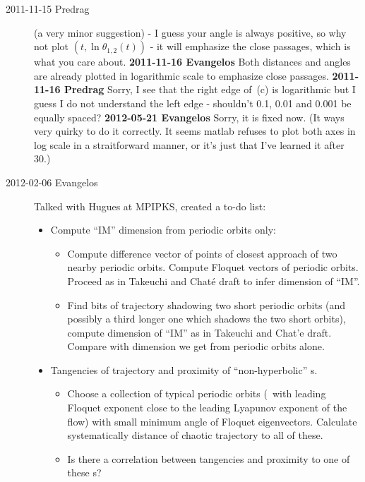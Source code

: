 \begin{description}
\item[2011-11-15 Predrag] (a very minor suggestion) - I guess your angle
is always positive, so why not plot $(t,\ln \theta_{1,2}(t))$ - it will
emphasize the close passages, which is what you care about.
{\bf 2011-11-16 Evangelos} Both distances and angles are already plotted
in logarithmic scale to emphasize close passages.
{\bf 2011-11-16 Predrag}
Sorry, I see that the right edge of \,(c) is logarithmic
but I guess I do not understand the left edge - shouldn't 0.1, 0.01 and 0.001
be equally spaced? {\bf 2012-05-21 Evangelos} Sorry, it is fixed now.
(It ways very quirky to do it correctly. It seems matlab refuses to
plot both axes in log scale in a straitforward manner,
or it's just that I've learned it after 30.)

\item[2012-02-06 Evangelos] Talked with Hugues at MPIPKS, created a to-do list:
\begin{itemize}
  \item Compute ``IM'' dimension from periodic orbits only:
	\begin{itemize}
        \item
        Compute difference vector of points of closest approach of two
        nearby periodic orbits. Compute Floquet vectors of periodic
        orbits. Proceed as in Takeuchi and Chat\'e draft to infer
        dimension of ``IM''.
        \item
        Find bits of trajectory shadowing two short periodic orbits (and
        possibly a third longer one which shadows the two short orbits),
        compute dimension of ``IM'' as in Takeuchi and Chat'e draft.
        Compare with dimension we get from periodic orbits alone.
    \end{itemize}
  \item Tangencies of trajectory and proximity of ``non-hyperbolic'' \po s.
	\begin{itemize}
        \item
        Choose a collection of typical periodic orbits (\ie\ with leading
        Floquet exponent close to the leading Lyapunov exponent of the flow)
        with small minimum angle of Floquet eigenvectors. Calculate
        systematically distance of chaotic trajectory to all of these.
        \item
        Is there a correlation between tangencies and proximity to one of
        these \po s?
	\end{itemize}
\end{itemize}


\end{description}

